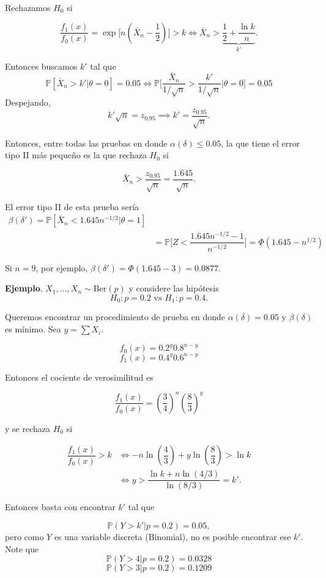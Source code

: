 \documentclass[
  12pt,
]{book}
\begin{document}
Rechazamos \(H_0\) si

\[\dfrac{f_1(x)}{f_0(x)} = \exp\bigg[n\left(\bar X_n - \dfrac 12\right)\bigg]>k \Leftrightarrow \bar X_n > \underbrace{\dfrac 12 + \dfrac{\ln k}{n}}_{k'} .\]

Entonces buscamos \(k'\) tal que
\[\mathbb P[\bar X_n>k'|\theta = 0]=0.05 \Leftrightarrow\mathbb P\bigg[\dfrac{\bar X_n}{1/\sqrt n}>\dfrac{k'}{1/\sqrt n}\bigg|\theta = 0\bigg]=0.05\]
Despejando,
\[k'\sqrt n= z_{0.95} \implies k'=\dfrac{z_{0.95}}{\sqrt n}.\]

Entonces, entre todas las pruebas en donde \(\alpha(\delta)\leq 0.05\), la que tiene el error tipo II más pequeño es la que rechaza \(H_0\) si

\[\bar X_n > \dfrac{z_{0.95}}{\sqrt n} = \dfrac{1.645}{\sqrt n}.\]

El error tipo II de esta prueba sería
\begin{align*}
\beta(\delta') = \mathbb P[\bar X_n<1.645n^{-1/2}|\theta = 1]\\
& = \mathbb P\bigg[Z < \dfrac{1.645n^{-1/2}-1}{n^{-1/2}}\bigg] = \Phi(1.645-n^{1/2})
\end{align*}

Si \(n=9\), por ejemplo, \(\beta(\delta') = \Phi(1.645-3) =0.0877.\)

\textbf{Ejemplo}. \(X_1,\dots,X_n\sim\text{Ber}(p)\) y considere las hipótesis
\[H_0: p = 0.2 \text{ vs } H_1: p = 0.4.\]

Queremos encontrar un procedimiento de prueba en donde \(\alpha(\delta) = 0.05\) y \(\beta(\delta)\) es mínimo. Sea \(y = \sum X_i\).

\[f_0(x) = 0.2^y0.8^{n-y}\]
\[f_1(x) = 0.4^y0.6^{n-y}\]

Entonces el cociente de verosimilitud es

\[\dfrac{f_1(x)}{f_0(x)}=\left(\dfrac 34\right)^n\left(\dfrac 83\right)^y\]

y se rechaza \(H_0\) si

\begin{align*}
\dfrac{f_1(x)}{f_0(x)}>k & \Leftrightarrow -n\ln \left(\dfrac 43 \right) + y \ln \left(\dfrac 83 \right)>\ln k\\ & \Leftrightarrow y>\dfrac{\ln k + n\ln(4/3)}{\ln (8/3)} = k'.
\end{align*}

Entonces basta con encontrar \(k'\) tal que

\[\mathbb P(Y>k'|p = 0.2) = 0.05,\]
pero como \(Y\) es una variable discreta (Binomial), no es posible encontrar ese \(k'\). Note que
\[\mathbb P(Y>4|p=0.2) = 0.0328\]
\[\mathbb P(Y>3|p=0.2) = 0.1209\]
\end{document}
